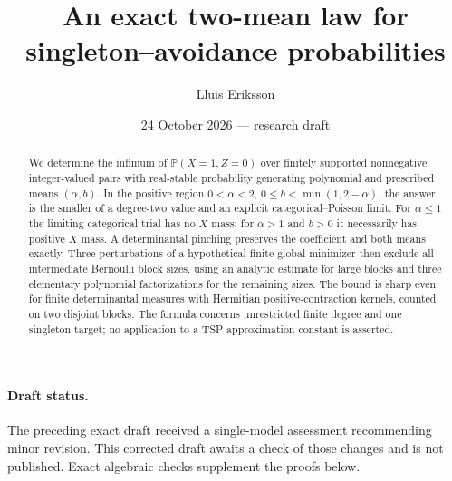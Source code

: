 \documentclass[11pt]{article}
\title{An exact two-mean law for singleton--avoidance probabilities}
\author{Lluis Eriksson}
\date{24 October 2026 --- research draft}
\newcommand{\Prob}{\mathbb P}
\begin{document}
\maketitle
\begin{abstract}
We determine the infimum of $\Prob(X=1,Z=0)$ over finitely supported
nonnegative integer-valued pairs with real-stable probability generating
polynomial and prescribed means $(\alpha,b)$. In the positive region
$0<\alpha<2$, $0\le b<\min(1,2-\alpha)$, the answer is the smaller of
a degree-two value and an explicit categorical--Poisson limit. For
$\alpha\le1$ the limiting categorical trial has no $X$ mass; for
$\alpha>1$ and $b>0$ it necessarily has positive $X$ mass. A determinantal
pinching preserves the coefficient and both means exactly. Three
perturbations of a hypothetical finite global minimizer then exclude
all intermediate Bernoulli block sizes, using an analytic estimate for
large blocks and three elementary polynomial factorizations for the
remaining sizes. The bound is sharp even for finite determinantal measures
with Hermitian positive-contraction kernels, counted on two disjoint
blocks. The formula concerns unrestricted finite
degree and one singleton target; no application to a TSP approximation
constant is asserted.
\end{abstract}

\paragraph{Draft status.}
The preceding exact draft received a single-model assessment recommending
minor revision. This corrected draft awaits a check of those changes and
is not published. Exact algebraic checks supplement the proofs below.
\end{document}
